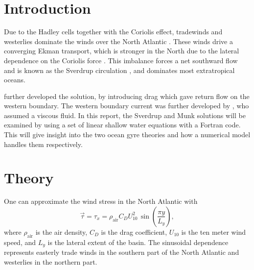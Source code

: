 \section{Introduction}
Due to the Hadley cells together with the Coriolis effect, tradewinds and westerlies dominate the winds over the North Atlantic \citep{Hartmann2016}. These winds drive a converging Ekman transport, which is stronger in the North due to the lateral dependence on the Coriolis force \citep{Ekman1905}. This imbalance forces a net southward flow and is known as the Sverdrup circulation \citep{Sverdrup1947}, and dominates most extratropical oceans. 

\citet{Stommel1948} further developed the solution, by introducing drag which gave return flow on the western boundary. The western boundary current was further developed by \citet{Munk1950}, who assumed a viscous fluid. In this report, the Sverdrup and Munk solutions will be examined by using a set of linear shallow water equations with a Fortran code. This will give insight into the two ocean gyre theories and how a numerical model handles them respectively. 

\section{Theory}
One can approximate the wind stress in the North Atlantic with 
\begin{equation}
    \vec{\tau}=\tau_x=\rho_\text{air}C_DU_{10}^2\,\sin\left(\frac{\pi y}{L_y}\right),
    \label{eq:stress}
\end{equation}
where $\rho_\text{air}$ is the air density, $C_D$ is the drag coefficient, $U_{10}$ is the ten meter wind speed, and $L_y$ is the lateral extent of the basin. The sinusoidal dependence represents easterly trade winds in the southern part of the North Atlantic and westerlies in the northern part. 

